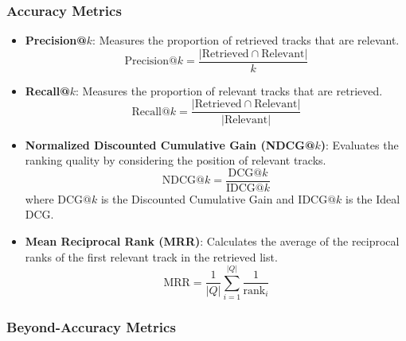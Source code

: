 \documentclass[sigconf]{acmart}
\begin{document}
\subsubsection{Accuracy Metrics}

\begin{itemize}
    \item \textbf{Precision@\( k \)}: Measures the proportion of retrieved tracks that are relevant.
    \[
    \text{Precision@}k = \frac{|\text{Retrieved} \cap \text{Relevant}|}{k}
    \]
    
    \item \textbf{Recall@\( k \)}: Measures the proportion of relevant tracks that are retrieved.
    \[
    \text{Recall@}k = \frac{|\text{Retrieved} \cap \text{Relevant}|}{|\text{Relevant}|}
    \]
    
    \item \textbf{Normalized Discounted Cumulative Gain (NDCG@\( k \))}: Evaluates the ranking quality by considering the position of relevant tracks.
    \[
    \text{NDCG@}k = \frac{\text{DCG@}k}{\text{IDCG@}k}
    \]
    where \( \text{DCG@}k \) is the Discounted Cumulative Gain and \( \text{IDCG@}k \) is the Ideal DCG.
    
    \item \textbf{Mean Reciprocal Rank (MRR)}: Calculates the average of the reciprocal ranks of the first relevant track in the retrieved list.
    \[
    \text{MRR} = \frac{1}{|Q|} \sum_{i=1}^{|Q|} \frac{1}{\text{rank}_i}
    \]
\end{itemize}

\subsubsection{Beyond-Accuracy Metrics}
\end{document}
